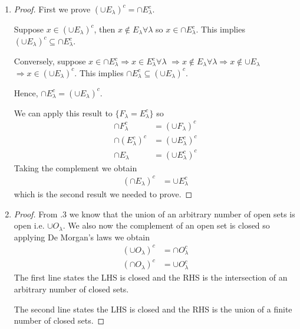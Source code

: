 \begin{enumerate}[label=(\alph*)]
    \item 
    \begin{proof}
        First we prove $(\cup E_\lambda)^c = \cap E_\lambda^c$.

        Suppose $x\in (\cup E_\lambda)^c$, then $x\not\in E_\lambda \forall \lambda$
        so $x \in \cap E_\lambda^c$. This implies $(\cup E_\lambda)^c \subseteq \cap E_\lambda^c$.

        Conversely, suppose $x\in \cap E_\lambda^c \Rightarrow x\in E_\lambda^c \forall \lambda$
         $\Rightarrow x\not\in E_\lambda \forall \lambda \Rightarrow x\not\in \cup E_\lambda$
         $\Rightarrow x\in (\cup E_\lambda)^c$. This implies $\cap E_\lambda^c \subseteq (\cup E_\lambda)^c$.

        Hence, $\cap E_\lambda^c = (\cup E_\lambda)^c$.

        We can apply this result to $\{F_\lambda = E_\lambda^c\}$ so 
        \begin{align*}
            \cap F_\lambda^c &= (\cup F_\lambda)^c \\
            \cap (E_\lambda^c)^c &= (\cup E_\lambda^c)^c \\
            \cap E_\lambda &= (\cup E_\lambda^c)^c
        \end{align*}
        Taking the complement we obtain
        \begin{align*}
            (\cap E_\lambda)^c &= \cup E_\lambda^c
        \end{align*}
        which is the second result we needed to prove.
    \end{proof}

    \item
    \begin{proof}
        From .3 we know that the union of an arbitrary number of 
        open sets is open i.e. $\cup O_\lambda$.
        We also now the complement of an open set is closed so applying De Morgan's
        laws we obtain
        \begin{align*}
            (\cup O_\lambda)^c &= \cap O_\lambda^c \\
            (\cap O_\lambda)^c &= \cup O_\lambda^c
        \end{align*} 
        The first line states the LHS is closed and the RHS is the intersection of an arbitrary number of 
        closed sets.

        The second line states the LHS is closed and the RHS is the union of a finite number of 
        closed sets.
    \end{proof}
\end{enumerate}


